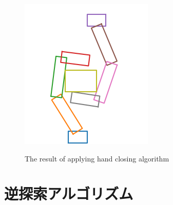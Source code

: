\documentclass[a4paper,twoside,12pt,papersize, dvipdfmx]{iirthesis}
\begin{document}
\begin{figure}[h]
\begin{minipage}{0.33\hsize}
\label{fig::planner::afterfclr}
\end{minipage}\hfill
\begin{minipage}{0.33\hsize}
\includegraphics[width=\hsize]{fig/3-new-planner/rec_FC_right_left.png}
\label{fig::planner::afterfcrl}
\end{minipage}
\caption{The result of applying hand closing algorithm}\label{fig::planner::fc}
\end{figure}

\section{逆探索アルゴリズム}\label{sec::planner::reverse}
\end{document}
